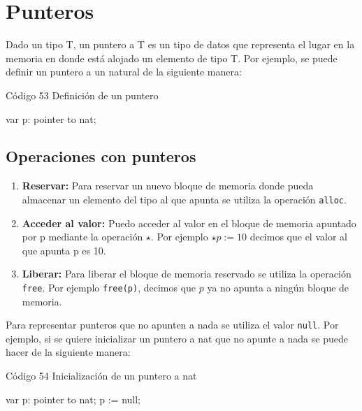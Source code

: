 \section{Punteros}
Dado un tipo T, un puntero a T es un tipo de datos que representa el lugar en la memoria en donde está alojado un elemento de tipo T. Por ejemplo, se puede definir un puntero a un natural de la siguiente manera:
\begin{codebox}{Código 53}
\footnotesize Definición de un puntero
\tcblower
\begin{pascallike}
var p: pointer to nat;
\end{pascallike}
\end{codebox}

\subsection{Operaciones con punteros}
\begin{enumerate}
    \item \textbf{Reservar:} Para reservar un nuevo bloque de memoria donde pueda almacenar un elemento del tipo al que apunta se utiliza la operación \texttt{alloc}.
    \item \textbf{Acceder al valor:} Puedo acceder al valor en el bloque de memoria apuntado por p mediante la operación $\star$. Por ejemplo \texttt{$\star p := 10$} decimos que el valor al que apunta p es 10.
    \item \textbf{Liberar:} Para liberar el bloque de memoria reservado se utiliza la operación \texttt{free}. Por ejemplo \texttt{free(p)}, decimos que $p$ ya no apunta a ningún bloque de memoria.
\end{enumerate}
Para representar punteros que no apunten a nada se utiliza el valor \texttt{null}. Por ejemplo, si se quiere inicializar un puntero a nat que no apunte a nada se puede hacer de la siguiente manera:
\begin{codebox}{Código 54}
\footnotesize Inicialización de un puntero a nat
\tcblower
\begin{pascallike}
var p: pointer to nat;
p := null;
\end{pascallike}
\end{codebox}

